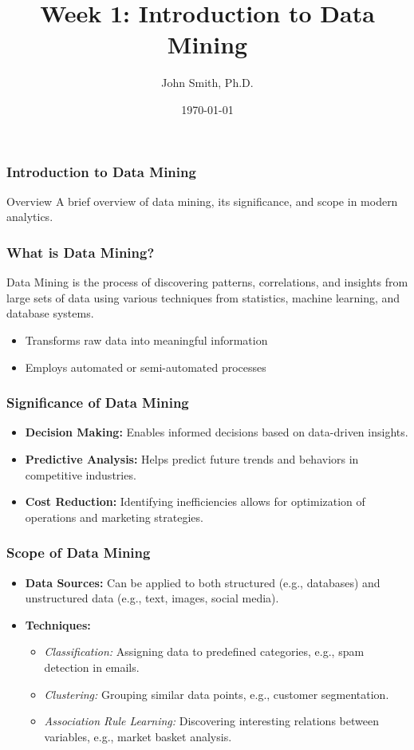 \documentclass[aspectratio=169]{beamer}
\title[Introduction to Data Mining]{Week 1: Introduction to Data Mining}
\author[J. Smith]{John Smith, Ph.D.}
\institute[University Name]{
  Department of Computer Science\\
  University Name\\
  \vspace{0.3cm}
  Email: email@university.edu\\
  Website: www.university.edu
}
\date{\today}
\begin{document}
\frame{\titlepage}

\begin{frame}[fragile]
    \frametitle{Introduction to Data Mining}
    \begin{block}{Overview}
        A brief overview of data mining, its significance, and scope in modern analytics.
    \end{block}
\end{frame}

\begin{frame}[fragile]
    \frametitle{What is Data Mining?}
    Data Mining is the process of discovering patterns, correlations, and insights from large sets of data using various techniques from statistics, machine learning, and database systems. 

    \begin{itemize}
        \item Transforms raw data into meaningful information
        \item Employs automated or semi-automated processes
    \end{itemize}
\end{frame}

\begin{frame}[fragile]
    \frametitle{Significance of Data Mining}
    \begin{itemize}
        \item \textbf{Decision Making:} Enables informed decisions based on data-driven insights.
        \item \textbf{Predictive Analysis:} Helps predict future trends and behaviors in competitive industries.
        \item \textbf{Cost Reduction:} Identifying inefficiencies allows for optimization of operations and marketing strategies.
    \end{itemize}
\end{frame}

\begin{frame}[fragile]
    \frametitle{Scope of Data Mining}
    \begin{itemize}
        \item \textbf{Data Sources:} Can be applied to both structured (e.g., databases) and unstructured data (e.g., text, images, social media).
        \item \textbf{Techniques:}
            \begin{itemize}
                \item \textit{Classification:} Assigning data to predefined categories, e.g., spam detection in emails.
                \item \textit{Clustering:} Grouping similar data points, e.g., customer segmentation.
                \item \textit{Association Rule Learning:} Discovering interesting relations between variables, e.g., market basket analysis.
            \end{itemize}
    \end{itemize}
\end{frame}
\end{document}
